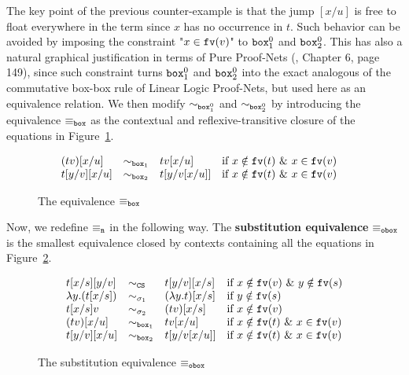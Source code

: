 \documentclass{LMCS}
\renewcommand{\>}{\rightarrow}
\def\lam{\lambda}
\newcommand{\fv}[1]{{\tt fv}(#1)}
\newcommand{\CS}{{\tt CS}}
\newcommand{\deft}[1]{{\bf #1}}
\newcommand{\ignore}[1]{}
\newcommand{\eqw}[1]{\equiv_{#1}}
\newcommand{\preeq}{\sim}
\newcommand{\preeqw}[1]{\sim_{#1}}
\newcommand{\preeqsigu}{\preeq_{\sigma_1}}
\newcommand{\preeqsigt}{\preeq_{\sigma_2}}
\newcommand{\fsymb}{\osymb\boite}
\newcommand{\osymb}{{\tt o}}
\newcommand{\eqf}{\eqw{\fsymb}}
\newcommand{\eqfz}{\equiv_\fz}
\newcommand{\fz}{{\tt n}}
\newcommand{\boite}{{\tt box}}
\newcommand{\sigt}{\boite_1}
\newcommand{\sigq}{\boite_2}
\begin{document}
The key point of the previous counter-example is that the jump $[x/u]$
is free to float everywhere in the term since $x$ has no occurrence in
$t$. Such behavior can be avoided by imposing the constraint "$x\in
\fv{v}$" to $\sigt^0$ and $\sigq^0$. This has also a natural graphical
justification in terms of Pure Proof-Nets (\cite{AccattoliTh}, Chapter 6, page 149), since such constraint 
turns $\sigt^0$ and $\sigq^0$ into the exact analogous \ignore{form} of the
commutative box-box rule of Linear Logic Proof-Nets, but used here as
an equivalence relation.  We then modify
$\preeqw{\sigt^0}$ and $\preeqw{\sigq^0}$ by
  introducing the equivalence $\equiv_{\boite}$ as the contextual and
  reflexive-transitive closure of the  equations in Figure~\ref{f:boite}.
\begin{figure}[ht]
\[ \begin{array}{llll@{\hspace{.5cm}}l}
(t v)[x/u]     & \preeqw{\sigt} & t v[x/u]    & 
  \mbox{if } x \notin \fv{t}\ \&\  x\in \fv{v}\\
t[y/v][x/u]    & \preeqw{\sigq} & t[y/v[x/u]] & 
  \mbox{if } x\notin \fv{t}\ \&\ x\in \fv{v}\\
\end{array}\]
\caption{The equivalence $\equiv_{\boite}$}
\label{f:boite}
\end{figure}

\noindent Now, we redefine $\eqfz$ in the following way. The \deft{substitution
  equivalence} $\eqf$ is the smallest equivalence closed by contexts
containing all the equations in Figure~\ref{f:eqf}. 

\begin{figure}[ht]
\[ \begin{array}{llll}
t[x/s][y/v] & \sim_{\CS} & t[y/v][x/s] &  \mbox{if } x\notin\fv{v}\ \&\ y\notin\fv{s}  \\
   \lam y. (t [x/s]) & \preeqsigu & (\lam y. t) [x/s]  &  \mbox{if } y\notin \fv{s} \\
   t[x/s] v & \preeqsigt & (t v)[x/s]&  \mbox{if } x\notin\fv{v} \\
(t v)[x/u]     & \preeqw{\sigt} & t v[x/u]    & 
  \mbox{if } x \notin \fv{t}\ \&\ x\in \fv{v}\\
t[y/v][x/u]    & \preeqw{\sigq} & t[y/v[x/u]] & 
  \mbox{if } x\notin \fv{t}\ \&\  x\in \fv{v}\\
\end{array} \]
\caption{The substitution equivalence $\eqf$}
\label{f:eqf}
\end{figure}
\end{document}
